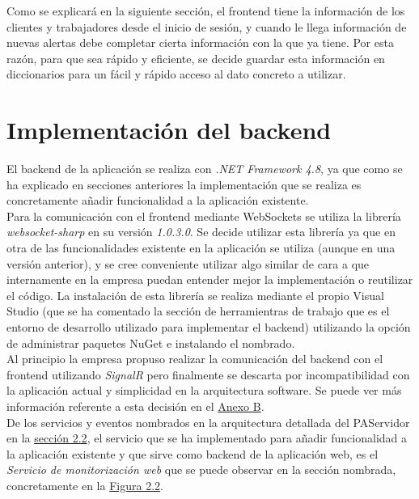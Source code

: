 Como se explicará en la siguiente sección, el frontend tiene la información de los clientes y trabajadores desde el inicio de sesión, y cuando le llega información de nuevas alertas debe completar cierta información con la que ya tiene. Por esta razón, para que sea rápido y eficiente, se decide guardar esta información en diccionarios para un fácil y rápido acceso al dato concreto a utilizar. 

\newpage
\section{Implementación del backend}

El backend de la aplicación se realiza con \textit{.NET Framework 4.8}, ya que como se ha explicado en secciones anteriores la implementación que se realiza es concretamente añadir funcionalidad a la aplicación existente. \\

Para la comunicación con el frontend mediante WebSockets se utiliza la librería \textit{websocket-sharp} \cite{websocket-sharp} en su versión \textit{1.0.3.0}.
Se decide utilizar esta librería ya que en otra de las funcionalidades existente en la aplicación se utiliza (aunque en una versión anterior), y se cree conveniente utilizar algo similar de cara a que internamente en la empresa puedan entender mejor la implementación o reutilizar el código.
La instalación de esta librería se realiza mediante el propio Visual Studio (que se ha comentado la sección de herramientras de trabajo que es el entorno de desarrollo utilizado para implementar el backend) utilizando la opción de administrar paquetes NuGet e instalando el nombrado. \\

Al principio la empresa propuso realizar la comunicación del backend con el frontend utilizando \textit{SignalR} \cite{signalr} pero finalmente se descarta por incompatibilidad con la aplicación actual y simplicidad en la arquitectura software. Se puede ver más información referente a esta decisión en el \hyperref[anexo-b]{Anexo B}. \\


De los servicios y eventos nombrados en la arquitectura detallada del PAServidor en la \hyperref[section-arquitectura]{sección 2.2}, el servicio que se ha implementado para añadir funcionalidad a la aplicación existente y que sirve como backend de la aplicación web, es el \textit{Servicio de monitorización web} que se puede observar en la sección nombrada, concretamente en la \hyperref[fig:PAServidor]{Figura 2.2}.\\

